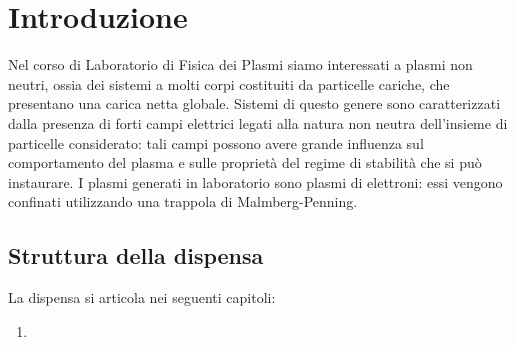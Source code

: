 \chapter{Introduzione}

Nel corso di Laboratorio di Fisica dei Plasmi siamo interessati a plasmi non neutri, ossia dei sistemi a molti corpi
costituiti da particelle cariche, che presentano una carica netta globale. Sistemi di questo genere sono caratterizzati
dalla presenza di forti campi elettrici legati alla natura non neutra dell'insieme di particelle considerato: tali campi
possono avere grande influenza sul comportamento del plasma e sulle proprietà del regime di stabilità che si può instaurare.
I plasmi generati in laboratorio sono plasmi di elettroni: essi vengono confinati utilizzando una trappola di Malmberg-Penning.

\section{Struttura della dispensa}

La dispensa si articola nei seguenti capitoli:
\begin{enumerate}
    \item
  \end{enumerate}
